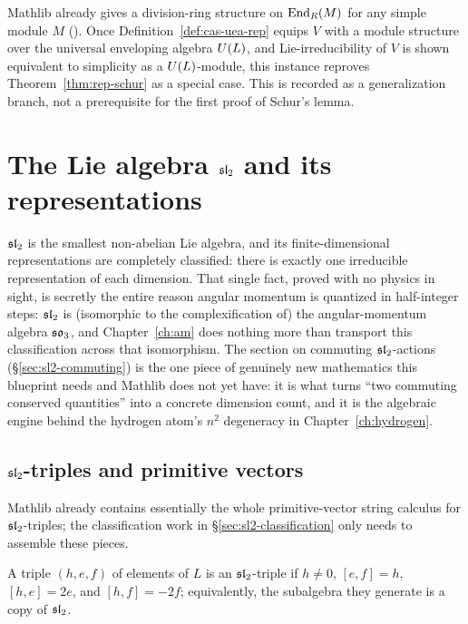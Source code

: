 \begin{remark}
  \label{rem:rep-schur-uea}
  Mathlib already gives a division-ring structure on $\operatorname{End}_R(M)$ for any
  simple module $M$ (\mathlibok). Once
  Definition~\ref{def:cas-uea-rep} equips $V$ with a module structure over
  the universal enveloping algebra $U(L)$, and Lie-irreducibility of $V$
  is shown equivalent to simplicity as a $U(L)$-module, this instance
  reproves Theorem~\ref{thm:rep-schur} as a special case. This is recorded as
  a generalization branch, not a prerequisite for the first proof of Schur's
  lemma.
\end{remark}

\chapter{The Lie algebra $\mathfrak{sl}_2$ and its representations}
\label{ch:sl2}

$\mathfrak{sl}_2$ is the smallest non-abelian Lie algebra, and its finite-dimensional
representations are completely classified: there is exactly one irreducible
representation of each dimension. That single fact, proved with no physics
in sight, is secretly the entire reason angular momentum is quantized in
half-integer steps: $\mathfrak{sl}_2$ is (isomorphic to the complexification of) the
angular-momentum algebra $\mathfrak{so}_3$, and Chapter~\ref{ch:am} does
nothing more than transport this classification across that isomorphism. The
section on commuting $\mathfrak{sl}_2$-actions (\S\ref{sec:sl2-commuting}) is the one
piece of genuinely new mathematics this blueprint needs and Mathlib does not
yet have: it is what turns ``two commuting conserved quantities'' into a
concrete dimension count, and it is the algebraic engine behind the
hydrogen atom's $n^2$ degeneracy in Chapter~\ref{ch:hydrogen}.

\section{$\mathfrak{sl}_2$-triples and primitive vectors}
\label{sec:sl2-basic}

Mathlib already contains essentially the whole primitive-vector string
calculus for $\mathfrak{sl}_2$-triples; the classification work in
\S\ref{sec:sl2-classification} only needs to assemble these pieces.

\begin{definition}
  \label{def:sl2-triple}
  \mathlibok
  A triple $(h,e,f)$ of elements of $L$ is an $\mathfrak{sl}_2$-triple if $h \neq 0$,
  $[e,f] = h$, $[h,e] = 2e$, and $[h,f] = -2f$; equivalently, the subalgebra
  they generate is a copy of $\mathfrak{sl}_2$.
\end{definition}

